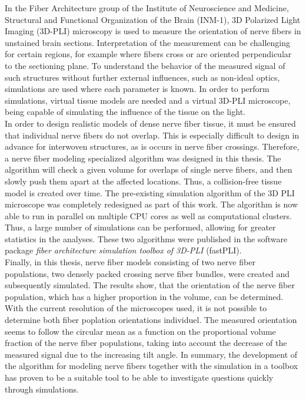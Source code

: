 %
In the Fiber Architecture group of the Institute of Neuroscience and Medicine, Structural and Functional Organization of the Brain (INM-1), 3D Polarized Light Imaging (3D-PLI) microscopy is used to measure the orientation of nerve fibers in unstained brain sections.
Interpretation of the measurement can be challenging for certain regions, for example where fibers cross or are oriented perpendicular to the sectioning plane.
To understand the behavior of the measured signal of such structures without further external influences, such as non-ideal optics, simulations are used where each parameter is known.
In order to perform simulations, virtual tissue models are needed and a virtual 3D-PLI microscope, being capable of simulating the influence of the tissue on the light.
\\
% 
In order to design realistic models of dense nerve fiber tissue, it must be ensured that individual nerve fibers do not overlap.
This is especially difficult to design in advance for interwoven structures, as is occurs in nerve fiber crossings.
Therefore, a nerve fiber modeling specialized algorithm was designed in this thesis.
The algorithm will check a given volume for overlaps of single nerve fibers, and then slowly push them apart at the affected locations.
Thus, a collision-free tissue model is created over time.
The pre-existing simulation algorithm of the 3D PLI microscope was completely redesigned as part of this work.
The algorithm is now able to run in parallel on multiple CPU cores as well as computational clusters.
Thus, a large number of simulations can be performed, allowing for greater statistics in the analyses.
These two algorithms were published in the software package \textit{fiber architecture simulation toolbox of 3D-PLI} (fastPLI).
\\
% 
Finally, in this thesis, nerve fiber models consisting of two nerve fiber populations, \ie{} two densely packed crossing nerve fiber bundles, were created and subsequently simulated.
The results show, that the orientation of the nerve fiber population, which has a higher proportion in the volume, can be determined.
With the current resolution of the microscopes used, it is not possible to determine both fiber poplation orientations individuel.
The measured orientation seems to follow the circular mean as a function on the proportional volume fraction of the nerve fiber populations, taking into account the decrease of the measured signal due to the increasing tilt angle.
In summary, the development of the algorithm for modeling nerve fibers together with the simulation in a toolbox has proven to be a suitable tool to be able to investigate questions quickly through simulations.
